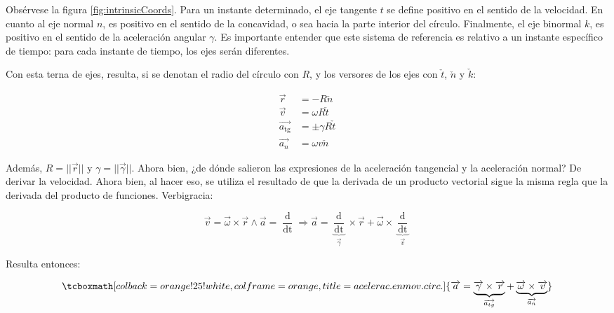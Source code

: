 \documentclass{article}
\begin{document}
Obsérvese la figura \ref{fig:intrinsicCoords}. Para un instante determinado, el eje tangente $t$ se define positivo en el sentido de la velocidad. En cuanto al eje normal $n$, es positivo en el sentido de la concavidad, o sea hacia la parte interior del círculo. Finalmente, el eje binormal $k$, es positivo en el sentido de la aceleración angular $\gamma$. Es importante entender que este sistema de referencia es relativo a un instante específico de tiempo: para cada instante de tiempo, los ejes serán diferentes.

Con esta terna de ejes, resulta, si se denotan el radio del círculo con $R$, y los versores de los ejes con $\check{t}$, $\check{n}$ y $\check{k}$:

\begin{subequations}
\begin{align}
\overrightarrow{r} &= -R \check{n} \\
\overrightarrow{v} &= \omega R \check{t} \\
\overrightarrow{a_{\mathop{tg}}} &= \pm \gamma R \check{t} \\
\overrightarrow{a_{n}} &= \omega v \check{n}
\end{align}
\end{subequations}

Además, $R = ||\overrightarrow{r}||$ y $\gamma = ||\overrightarrow{\gamma}||$. Ahora bien, ¿de dónde salieron las expresiones de la aceleración tangencial y la aceleración normal? De derivar la velocidad. Ahora bien, al hacer eso, se utiliza el resultado de que la derivada de un producto vectorial sigue la misma regla que la derivada del producto de funciones. Verbigracia:

\begin{equation}
\overrightarrow{v} = \overrightarrow{\omega} \times \overrightarrow{r} \wedge \overrightarrow{a} = \frac{\mathop{d\overrightarrow{v}}}{\mathop{dt}} \Rightarrow \overrightarrow{a} = \underbrace{ \frac{\mathop{d\overrightarrow{\omega}}}{\mathop{dt}} }_{\overrightarrow{\gamma}} \times \overrightarrow{r} + \overrightarrow{\omega} \times \underbrace{ \frac{\mathop{d\overrightarrow{r}}}{\mathop{dt}} }_{\overrightarrow{v}}
\end{equation}

Resulta entonces:

\begin{equation}
\tcboxmath[colback=orange!25!white,colframe=orange, title=acelerac. en mov. circ.]{
\overrightarrow{a} = \underbrace{ \overrightarrow{\gamma} \times \overrightarrow{r} }_{\overrightarrow{a_{\mathop{tg}}}} + \underbrace{ \overrightarrow{\omega} \times \overrightarrow{v} }_{\overrightarrow{a_n}}
}
\end{equation}
\end{document}
